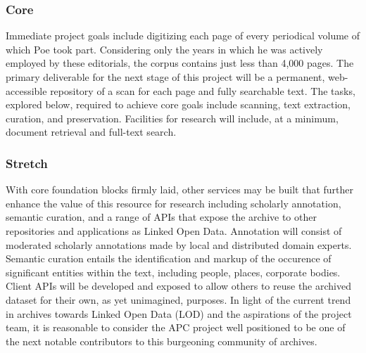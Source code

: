 \subsubsection{Core}
Immediate project goals include digitizing each page of every periodical volume of which Poe took part. Considering only the years in which he was actively employed by these editorials, the corpus contains just less than 4,000 pages. The primary deliverable for the next stage of this project will be a permanent, web-accessible repository of a scan for each page and fully searchable text. The tasks, explored below, required to achieve core goals include scanning, text extraction, curation, and preservation. Facilities for research will include, at a minimum, document retrieval and full-text search. 

\subsubsection{Stretch}
With core foundation blocks firmly laid, other services may be built that further enhance the value of this resource for research including scholarly annotation, semantic curation, and a range of APIs that expose the archive to other repositories and applications as Linked Open Data. Annotation will consist of moderated scholarly annotations made by local and distributed domain experts.  Semantic curation entails the identification and markup of the occurence of significant entities within the text, including people, places, corporate bodies. Client APIs will be developed and exposed to allow others to reuse the archived dataset for their own, as yet unimagined, purposes. In light of the current trend in archives towards Linked Open Data (LOD) and the aspirations of the project team, it is reasonable to consider the APC project well positioned to be one of the next notable contributors to this burgeoning community of archives.